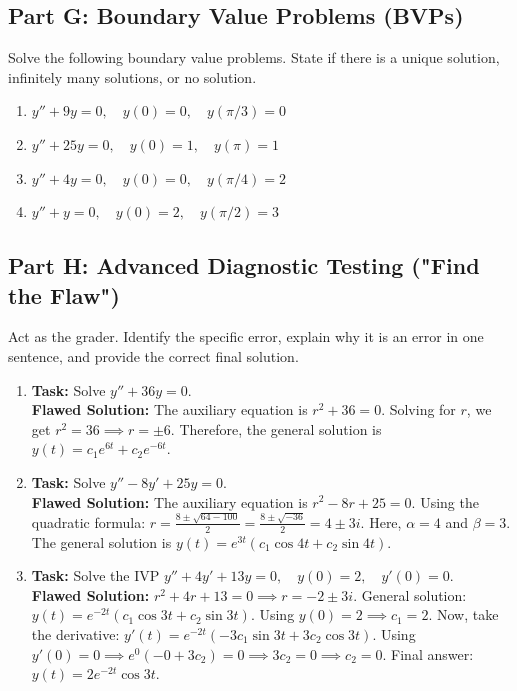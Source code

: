 \documentclass[11pt]{article}
\begin{document}
\subsection*{Part G: Boundary Value Problems (BVPs)}
Solve the following boundary value problems. State if there is a unique solution, infinitely many solutions, or no solution.
\begin{enumerate}[label=\textbf{\arabic*.}, resume]
    \item $y'' + 9y = 0, \quad y(0) = 0, \quad y(\pi/3) = 0$
    \item $y'' + 25y = 0, \quad y(0) = 1, \quad y(\pi) = 1$
    \item $y'' + 4y = 0, \quad y(0) = 0, \quad y(\pi/4) = 2$
    \item $y'' + y = 0, \quad y(0) = 2, \quad y(\pi/2) = 3$
\end{enumerate}

\subsection*{Part H: Advanced Diagnostic Testing ("Find the Flaw")}
Act as the grader. Identify the specific error, explain why it is an error in one sentence, and provide the correct final solution.
\begin{enumerate}[label=\textbf{\arabic*.}, resume]
    \item \textbf{Task:} Solve $y'' + 36y = 0$. \\
    \textbf{Flawed Solution:} The auxiliary equation is $r^2 + 36 = 0$. Solving for $r$, we get $r^2 = 36 \implies r = \pm 6$. Therefore, the general solution is $y(t) = c_1e^{6t} + c_2e^{-6t}$.
    
    \item \textbf{Task:} Solve $y'' - 8y' + 25y = 0$. \\
    \textbf{Flawed Solution:} The auxiliary equation is $r^2 - 8r + 25 = 0$. Using the quadratic formula: $r = \frac{8 \pm \sqrt{64 - 100}}{2} = \frac{8 \pm \sqrt{-36}}{2} = 4 \pm 3i$. Here, $\alpha = 4$ and $\beta = 3$. The general solution is $y(t) = e^{3t}(c_1 \cos 4t + c_2 \sin 4t)$.
    
    \item \textbf{Task:} Solve the IVP $y'' + 4y' + 13y = 0, \quad y(0) = 2, \quad y'(0) = 0$. \\
    \textbf{Flawed Solution:} $r^2 + 4r + 13 = 0 \implies r = -2 \pm 3i$. General solution: $y(t) = e^{-2t}(c_1 \cos 3t + c_2 \sin 3t)$. Using $y(0) = 2 \implies c_1 = 2$. Now, take the derivative: $y'(t) = e^{-2t}(-3c_1 \sin 3t + 3c_2 \cos 3t)$. Using $y'(0) = 0 \implies e^0(-0 + 3c_2) = 0 \implies 3c_2 = 0 \implies c_2 = 0$. Final answer: $y(t) = 2e^{-2t}\cos 3t$.
\end{enumerate}
\end{document}
